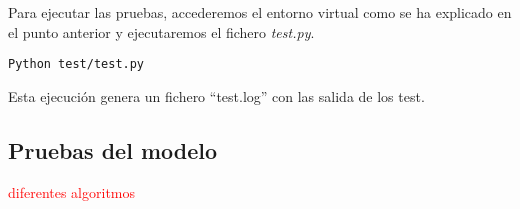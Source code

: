 Para ejecutar las pruebas, accederemos el entorno virtual como se ha explicado en el punto anterior y ejecutaremos el fichero \emph{test.py}.
\begin{verbatim}
Python test/test.py
\end{verbatim}

Esta ejecución genera un fichero ``test.log'' con las salida de los test.


\subsection{Pruebas del modelo}
\textcolor{red}{diferentes algoritmos}


